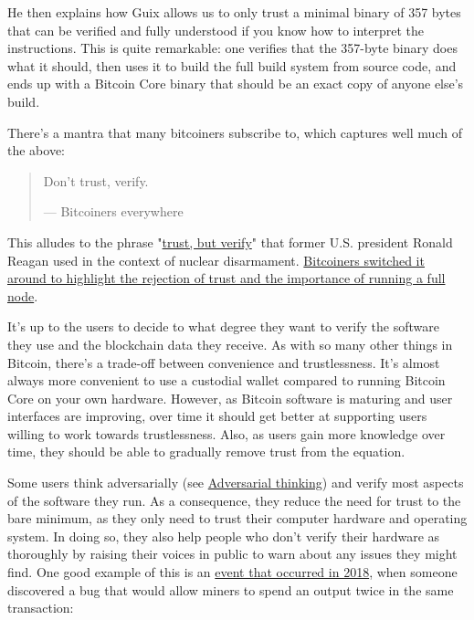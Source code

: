 He then explains how Guix allows us to only trust a minimal binary of
357 bytes that can be verified and fully understood if you know how to
interpret the instructions. This is quite remarkable: one verifies that
the 357-byte binary does what it should, then uses it to build the full
build system from source code, and ends up with a Bitcoin Core binary
that should be an exact copy of anyone else's build.

There's a mantra that many bitcoiners subscribe to, which captures well
much of the above:

\begin{quote}
Don't trust, verify.

---  Bitcoiners everywhere
\end{quote}

This alludes to the phrase
"\href{https://en.wikipedia.org/wiki/Trust,_but_verify}{trust, but
verify}" that former U.S. president Ronald Reagan used in the context of
nuclear disarmament.
\href{https://twitter.com/Truthcoin/status/1491415722123153408?s=20\&t=ZyROxZxlBppdRpuuzsiF5w}{Bitcoiners
switched it around to highlight the rejection of trust and the
importance of running a full node}.

It's up to the users to decide to what degree they want to verify the
software they use and the blockchain data they receive. As with so many
other things in Bitcoin, there's a trade-off between convenience and
trustlessness. It's almost always more convenient to use a custodial
wallet compared to running Bitcoin Core on your own hardware. However,
as Bitcoin software is maturing and user interfaces are improving, over
time it should get better at supporting users willing to work towards
trustlessness. Also, as users gain more knowledge over time, they should
be able to gradually remove trust from the equation.

Some users think adversarially (see
\protect\hyperlink{adversarialthinking}{Adversarial thinking}) and
verify most aspects of the software they run. As a consequence, they
reduce the need for trust to the bare minimum, as they only need to
trust their computer hardware and operating system. In doing so, they
also help people who don't verify their hardware as thoroughly by
raising their voices in public to warn about any issues they might find.
One good example of this is an
\href{https://bitcoincore.org/en/2018/09/20/notice/}{event that occurred
in 2018}, when someone discovered a bug that would allow miners to spend
an output twice in the same transaction:

